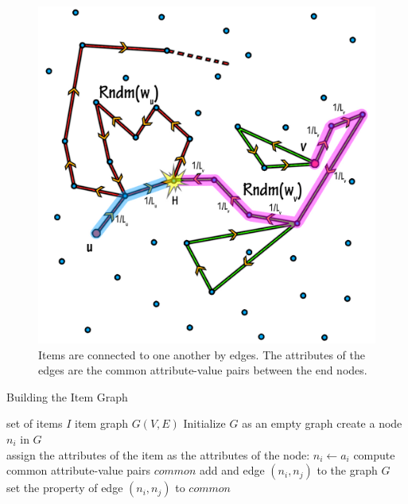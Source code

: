\documentclass{acm_proc_article-sp}
\begin{document}
\begin{figure}[htp]
\centering
\includegraphics[scale=0.05]{Results/LearningComponent.jpg}
\caption{Items are connected to one another by edges. The attributes of the edges are the common attribute-value pairs between the end nodes.}
\label{edge_G}
\end{figure}

\begin{algorithm}
\label{buidingItemGraph_algo}
\caption{Building the Item Graph}
\begin{algorithmic}[1]
\renewcommand{\algorithmicrequire}{\textbf{Input:}}
\renewcommand{\algorithmicensure}{\textbf{Output:}}

\REQUIRE set of items $I$
\ENSURE  item graph $G(V, E)$
\STATE Initialize $G$ as an empty graph
\STATE 
create a node $n_i$ in $G$\\
assign the attributes of the item as the attributes of the node:
$n_i \longleftarrow a_i$
 \STATE
 compute common attribute-value pairs $common$
  \STATE 
  add and edge $(n_i, n_j)$ to the graph $G$\\
  set the property of edge $(n_i, n_j)$ to $common$
 \ENDIF
 \ENDFOR
\ENDFOR
\end{algorithmic}
\end{algorithm}
\end{document}
